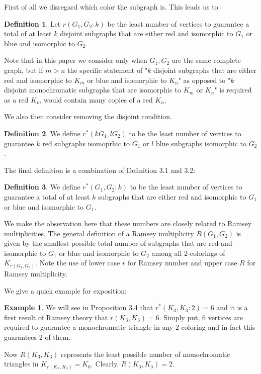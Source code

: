 \documentclass{article}
\theoremstyle{definition}
\newtheorem{exmp}{Example}[section]
\theoremstyle{remark}
\theoremstyle{definition}
\newtheorem{defn}{Definition}[section]
\begin{document}
First of all we disregard which color the subgraph is. This leads us to:

\begin{defn}


Let $r(G_1,G_2:k)$ be the least number of vertices to guarantee a total of at least $k$ disjoint subgraphs that are either red and isomorphic to $G_1$ or blue and isomorphic to $G_2$.

\end{defn}

Note that in this paper we consider only when $G_1,G_2$ are the same complete graph, but if $m> n$ the specific statement of "$k$ disjoint subgraphs that are either red and isomorphic to $K_m$ or blue and isomorphic to $K_n$" as opposed to "$k$ disjoint monochromatic subgraphs that are isomorphic to $K_m$ or $K_n$" is required as a red $K_m$ would contain many copies of a red $K_n$.

We also then consider removing the disjoint condition.


\begin{defn}
We define $r^*(kG_1,lG_2)$ to be the least number of vertices to guarantee $k$ red subgraphs isomoprhic to $G_1$ or $l$ blue subgraphs isomorphic to $G_2$.
\end{defn}

The final definition is a combination of Definition 3.1 and 3.2:

\begin{defn}
We define $r^*(G_1,G_2:k)$ to be the least number of vertices to guarantee a total of at least $k$ subgraphs that are either red and isomorphic to $G_1$ or blue and isomorphic to $G_1$.
\end{defn}

We make the observation here that these numbers are closely related to Ramsey multiplicities. The general definition of a Ramsey multiplicity $R(G_1,G_2)$ is given by the smallest possible total number of subgraphs that are red and isomorphic to $G_1$ or blue and isomorphic to $G_2$ among all $2$-colorings of $K_{r(G_1,G_2)}$. Note the use of lower case $r$ for Ramsey number and upper case $R$ for Ramsey multiplicity. 

We give a quick example for exposition:

\begin{exmp}

We will see in Proposition 3.4 that $r^{*}(K_{3},K_{3}:2)=6$ and it is a first result of Ramsey theory that $r(K_{3},K_{3})=6$. Simply put, 6 vertices are required to guarantee a monochromatic triangle in any $2$-coloring and in fact this guarantees 2 of them.

Now $R(K_{3},K_{3})$ represents the least possible number of monochromatic triangles in $K_{r(K_3,K_3)}=K_6$. Clearly, $R(K_{3},K_{3})=2$. 
\end{exmp}
\end{document}
